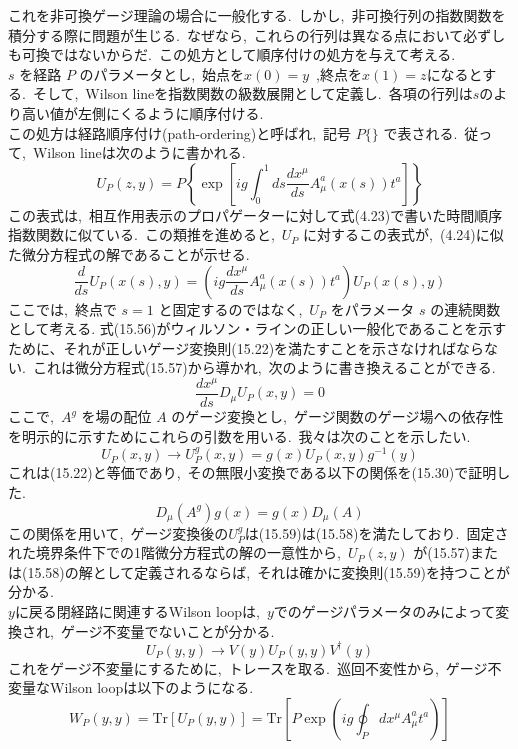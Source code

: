 \documentclass[uplatex,dvipdfmx]{jsarticle}
\begin{document}
これを非可換ゲージ理論の場合に一般化する.~しかし,~非可換行列の指数関数を積分する際に問題が生じる.~なぜなら,~これらの行列は異なる点において必ずしも可換ではないからだ.~この処方として順序付けの処方を与えて考える.\\
$s$ を経路 $P$ のパラメータとし,~始点を$x(0) = y$~,終点を$x(1) = z$になるとする.~そして,~Wilson lineを指数関数の級数展開として定義し.~各項の行列は$s$のより高い値が左側にくるように順序付ける.\\
この処方は経路順序付け(path-ordering)と呼ばれ,~記号 $P \{ \}$ で表される.~従って,~Wilson lineは次のように書かれる.
\begin{equation}
    U_P(z,y) = P \left\{ \exp \left[ ig \int_0^1 ds \frac{dx^\mu}{ds} A_\mu^a(x(s)) t^a \right] \right\}
\end{equation}
この表式は,~相互作用表示のプロパゲーターに対して式(4.23)で書いた時間順序指数関数に似ている.~この類推を進めると,~$U_P$ に対するこの表式が,~(4.24)に似た微分方程式の解であることが示せる.
\begin{equation}
    \frac{d}{ds} U_P(x(s), y) = \left( ig \frac{dx^\mu}{ds} A_\mu^a(x(s)) t^a \right) U_P(x(s), y)
\end{equation}
ここでは,~終点で $s=1$ と固定するのではなく,~$U_P$ をパラメータ $s$ の連続関数として考える.
式(15.56)がウィルソン・ラインの正しい一般化であることを示すために、それが正しいゲージ変換則(15.22)を満たすことを示さなければならない.~これは微分方程式(15.57)から導かれ,~次のように書き換えることができる.
\begin{equation}
    \frac{dx^\mu}{ds} D_\mu U_P(x, y) = 0
\end{equation}
ここで,~$A^g$ を場の配位 $A$ のゲージ変換とし,~ゲージ関数のゲージ場への依存性を明示的に示すためにこれらの引数を用いる.~我々は次のことを示したい.
\begin{equation}
    U_P(x, y) \to U_P^g(x, y) = g(x) U_P(x, y) g^{-1}(y)
\end{equation}
これは(15.22)と等価であり,~その無限小変換である以下の関係を(15.30)で証明した.
\begin{equation}
    D_\mu(A^g) g(x) = g(x) D_\mu(A)
\end{equation}
この関係を用いて,~ゲージ変換後の$U_P^g$は(15.59)は(15.58)を満たしており.~固定された境界条件下での1階微分方程式の解の一意性から,~$U_P(z,y)$ が(15.57)または(15.58)の解として定義されるならば,~それは確かに変換則(15.59)を持つことが分かる.\\
$y$に戻る閉経路に関連するWilson loopは,~$y$でのゲージパラメータのみによって変換され,~ゲージ不変量でないことが分かる.
\begin{equation}
    U_P(y,y) \rightarrow V(y)U_P(y,y)V^\dagger(y)
\end{equation}
これをゲージ不変量にするために,~トレースを取る.~巡回不変性から,~ゲージ不変量なWilson loopは以下のようになる.
\begin{equation}
    W_P(y,y) = \text{Tr} \left[ U_P(y,y) \right] = \text{Tr} \left[ P \exp \left( ig \oint_P dx^\mu A_\mu^a t^a \right) \right]
\end{equation}
\newpage
\end{document}
